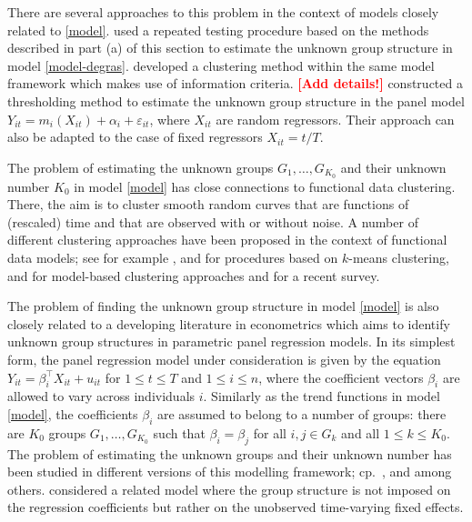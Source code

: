 \documentclass[a4paper,12pt]{article}
\begin{document}
There are several approaches to this problem in the context of models closely related to \eqref{model}. \cite{DegrasWu2012} used a repeated testing procedure based on the methods described in part (a) of this section to estimate the unknown group structure in model \eqref{model-degras}. \cite{Zhang2013} developed a clustering method within the same model framework which makes use of information criteria. \textcolor{red}{\textbf{[Add details!]}} \cite{VogtLinton2017} constructed a thresholding method to estimate the unknown group structure in the panel model $Y_{it} = m_i(X_{it}) + \alpha_i + \varepsilon_{it}$, where $X_{it}$ are random regressors. Their approach can also be adapted to the case of fixed regressors $X_{it} = t/T$. 


The problem of estimating the unknown groups $G_1,\ldots,G_{K_0}$ and their unknown number $K_0$ in model \eqref{model} has close connections to functional data clustering. There, the aim is to cluster smooth random curves that are functions of (rescaled) time and that are observed with or without noise. A number of different clustering approaches have been proposed in the context of functional data models; see for example \cite{Abraham2003}, \cite{Tarpey2003} and \cite{Tarpey2007} for procedures based on $k$-means clustering, \cite{James2003} and \cite{Chiou2007} for model-based clustering approaches and \cite{Jacques2014} for a recent survey. 


The problem of finding the unknown group structure in model \eqref{model} is also closely related to a developing literature in econometrics which aims to identify unknown group structures in parametric panel regression models. In its simplest form, the panel regression model under consideration is given by the equation $Y_{it} = \beta_i^\top X_{it} + u_{it}$ for $1 \le t \le T$ and $1 \le i \le n$, where the coefficient vectors $\beta_i$ are allowed to vary across individuals $i$. Similarly as the trend functions in model \eqref{model}, the coefficients $\beta_i$ are assumed to belong to a number of groups: there are $K_0$ groups $G_1,\ldots,G_{K_0}$ such that $\beta_i = \beta_j$ for all $i,j \in G_k$ and all $1\le k \le K_0$. The problem of estimating the unknown groups and their unknown number has been studied in different versions of this modelling framework; cp.\ \cite{Su2016}, \cite{Su2018} and \cite{Wang2018} among others. \cite{Bonhomme2015} considered a related model where the group structure is not imposed on the regression coefficients but rather on the unobserved time-varying fixed effects. 
\end{document}
